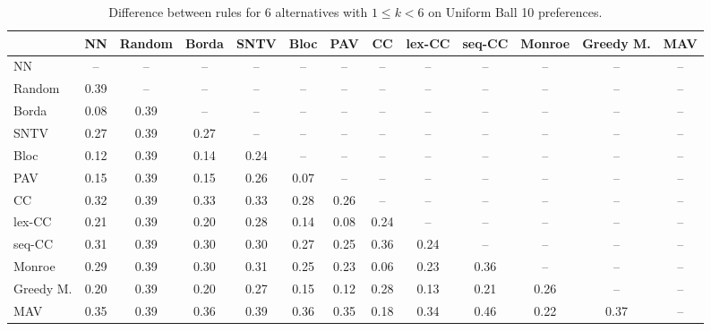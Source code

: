 
\begin{table*}[htbp]
\centering
\begin{tabular}{lcccccccccccc}
\toprule
 & NN & Random & Borda & SNTV & Bloc & PAV & CC & lex-CC & seq-CC & Monroe & Greedy M. & MAV \\
\midrule
NN & -- & -- & -- & -- & -- & -- & -- & -- & -- & -- & -- & -- \\
Random & \cellcolor{blue!39} 0.39 & -- & -- & -- & -- & -- & -- & -- & -- & -- & -- & -- \\
Borda & \cellcolor{blue!8} 0.08 & \cellcolor{blue!39} 0.39 & -- & -- & -- & -- & -- & -- & -- & -- & -- & -- \\
SNTV & \cellcolor{blue!27} 0.27 & \cellcolor{blue!39} 0.39 & \cellcolor{blue!27} 0.27 & -- & -- & -- & -- & -- & -- & -- & -- & -- \\
Bloc & \cellcolor{blue!12} 0.12 & \cellcolor{blue!39} 0.39 & \cellcolor{blue!14} 0.14 & \cellcolor{blue!24} 0.24 & -- & -- & -- & -- & -- & -- & -- & -- \\
PAV & \cellcolor{blue!15} 0.15 & \cellcolor{blue!39} 0.39 & \cellcolor{blue!15} 0.15 & \cellcolor{blue!26} 0.26 & \cellcolor{blue!7} 0.07 & -- & -- & -- & -- & -- & -- & -- \\
CC & \cellcolor{blue!32} 0.32 & \cellcolor{blue!39} 0.39 & \cellcolor{blue!33} 0.33 & \cellcolor{blue!33} 0.33 & \cellcolor{blue!28} 0.28 & \cellcolor{blue!26} 0.26 & -- & -- & -- & -- & -- & -- \\
lex-CC & \cellcolor{blue!21} 0.21 & \cellcolor{blue!39} 0.39 & \cellcolor{blue!20} 0.20 & \cellcolor{blue!28} 0.28 & \cellcolor{blue!14} 0.14 & \cellcolor{blue!8} 0.08 & \cellcolor{blue!24} 0.24 & -- & -- & -- & -- & -- \\
seq-CC & \cellcolor{blue!31} 0.31 & \cellcolor{blue!39} 0.39 & \cellcolor{blue!30} 0.30 & \cellcolor{blue!30} 0.30 & \cellcolor{blue!27} 0.27 & \cellcolor{blue!25} 0.25 & \cellcolor{blue!36} 0.36 & \cellcolor{blue!24} 0.24 & -- & -- & -- & -- \\
Monroe & \cellcolor{blue!28} 0.29 & \cellcolor{blue!39} 0.39 & \cellcolor{blue!30} 0.30 & \cellcolor{blue!31} 0.31 & \cellcolor{blue!25} 0.25 & \cellcolor{blue!23} 0.23 & \cellcolor{blue!6} 0.06 & \cellcolor{blue!23} 0.23 & \cellcolor{blue!36} 0.36 & -- & -- & -- \\
Greedy M. & \cellcolor{blue!20} 0.20 & \cellcolor{blue!39} 0.39 & \cellcolor{blue!20} 0.20 & \cellcolor{blue!27} 0.27 & \cellcolor{blue!15} 0.15 & \cellcolor{blue!12} 0.12 & \cellcolor{blue!28} 0.28 & \cellcolor{blue!13} 0.13 & \cellcolor{blue!21} 0.21 & \cellcolor{blue!26} 0.26 & -- & -- \\
MAV & \cellcolor{blue!35} 0.35 & \cellcolor{blue!39} 0.39 & \cellcolor{blue!36} 0.36 & \cellcolor{blue!39} 0.39 & \cellcolor{blue!36} 0.36 & \cellcolor{blue!35} 0.35 & \cellcolor{blue!18} 0.18 & \cellcolor{blue!34} 0.34 & \cellcolor{blue!46} 0.46 & \cellcolor{blue!22} 0.22 & \cellcolor{blue!37} 0.37 & -- \\
\bottomrule
\end{tabular}

\caption{Difference between rules for 6 alternatives with $1 \leq k < 6$ on Uniform Ball 10 preferences.}
\label{tab:rule_distance_heatmap-m=[6]-pref_dist=euclidean__args__dimensions=10_-_space=uniform_ball}
\end{table*}
    
